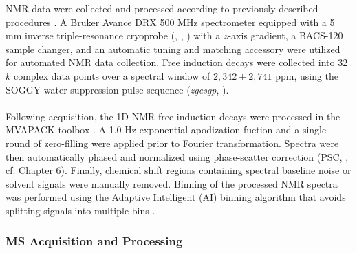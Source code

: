 \begin{doublespace}
NMR data were collected and processed according to previously described
procedures \cite{zhang:jiomic2013}. A Bruker Avance DRX 500 MHz spectrometer
equipped with a 5 mm inverse triple-resonance cryoprobe (\hnmr{}, \cnmr{},
\nnmr{}) with a $z$-axis gradient, a BACS-120 sample changer, and an automatic
tuning and matching accessory were utilized for automated NMR data collection.
Free induction decays were collected into 32$k$ complex data points over a
spectral window of $2,342 \pm 2,741$ ppm, using the SOGGY water suppression
pulse sequence (\emph{zgesgp}, \cite{hwang:jmr1995,nguyen:jmr2007}).
\\\\
Following acquisition, the 1D \hnmr{} NMR free induction decays were processed
in the MVAPACK toolbox \cite{worley:acscb2014}. A 1.0 Hz exponential
apodization fuction and a single round of zero-filling were applied prior to
Fourier transformation. Spectra were then automatically phased and normalized
using phase-scatter correction (PSC, \cite{worley:cils2014},
cf. \hyperlink{chapter.6}{Chapter 6}). Finally, chemical shift regions
containing spectral baseline noise or solvent signals were manually removed.
Binning of the processed NMR spectra was performed using the Adaptive
Intelligent (AI) binning algorithm that avoids splitting signals into
multiple bins \cite{demeyer:anchem2008}.
\end{doublespace}

\subsubsection{MS Acquisition and Processing}

